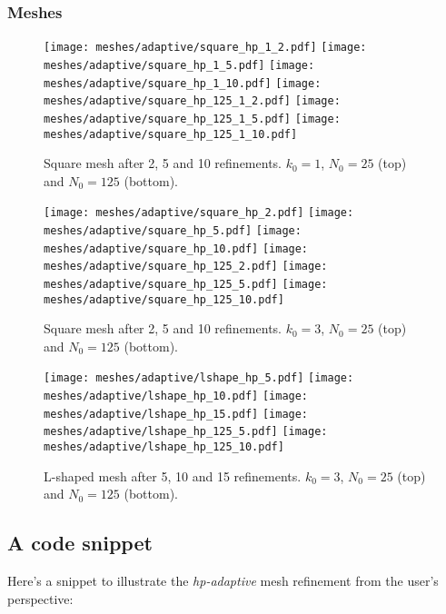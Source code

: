 \newpage
\subsubsection{Meshes}

\begin{figure}[!ht]
	\centering
    \texttt{[image: meshes/adaptive/square\_hp\_1\_2.pdf]}
	\texttt{[image: meshes/adaptive/square\_hp\_1\_5.pdf]}
	\texttt{[image: meshes/adaptive/square\_hp\_1\_10.pdf]}
    \texttt{[image: meshes/adaptive/square\_hp\_125\_1\_2.pdf]}
	\texttt{[image: meshes/adaptive/square\_hp\_125\_1\_5.pdf]}
	\texttt{[image: meshes/adaptive/square\_hp\_125\_1\_10.pdf]}
	\caption{Square mesh after 2, 5 and 10 refinements. $k_0 = 1$, $N_0 = 25$ (top) and $N_0 = 125$ (bottom).}
\end{figure}


\newpage

\begin{figure}[!ht]
	\centering
    \texttt{[image: meshes/adaptive/square\_hp\_2.pdf]}
	\texttt{[image: meshes/adaptive/square\_hp\_5.pdf]}
	\texttt{[image: meshes/adaptive/square\_hp\_10.pdf]}
    \texttt{[image: meshes/adaptive/square\_hp\_125\_2.pdf]}
	\texttt{[image: meshes/adaptive/square\_hp\_125\_5.pdf]}
	\texttt{[image: meshes/adaptive/square\_hp\_125\_10.pdf]}
	\caption{Square mesh after 2, 5 and 10 refinements. $k_0 = 3$, $N_0 = 25$ (top) and $N_0 = 125$ (bottom).}
\end{figure}

\begin{figure}[!ht]
	\centering
	\texttt{[image: meshes/adaptive/lshape\_hp\_5.pdf]}
	\texttt{[image: meshes/adaptive/lshape\_hp\_10.pdf]}
	\texttt{[image: meshes/adaptive/lshape\_hp\_15.pdf]}
    \texttt{[image: meshes/adaptive/lshape\_hp\_125\_5.pdf]}
	\texttt{[image: meshes/adaptive/lshape\_hp\_125\_10.pdf]}
	\caption{L-shaped mesh after 5, 10 and 15 refinements. $k_0 = 3$, $N_0 = 25$ (top) and $N_0 = 125$ (bottom).}
\end{figure}

\newpage
\subsection{A code snippet}

Here's a snippet to illustrate the \textit{hp-adaptive} mesh refinement from the user's perspective:

